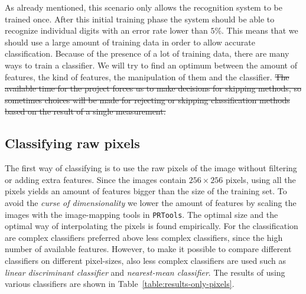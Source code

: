 \documentclass{article}
\begin{document}
As already mentioned, this scenario only allows the recognition system to be trained once. After this initial training phase the system should be able to recognize individual digits with an error rate lower than $5\%$. This means that we should use a large amount of training data in order to allow accurate classification. Because of the presence of a lot of training data, there are many ways to train a classifier. We will try to find an optimum between the amount of features, the kind of features, the manipulation of them and the classifier. \st{The available time for the project forces us to make decisions for skipping methods, so sometimes choices will be made for rejecting or skipping classification methods based on the result of a single measurement.} 

\subsection{Classifying raw pixels}
The first way of classifying is to use the raw pixels of the image without filtering or adding extra features. Since the images contain $256 \times 256$ pixels, using all the pixels yields an amount of features bigger than the size of the training set. To avoid the \emph{curse of dimensionality} we lower the amount of features by scaling the images with the image-mapping tools in \texttt{PRTools}. The optimal size and the optimal way of interpolating the pixels is found empirically. For the classification are complex classifiers preferred above less complex classifiers, since the high number of available features. However, to make it possible to compare different classifiers on different pixel-sizes, also less complex classifiers are used such as \textit{linear discriminant classifier} and \textit{nearest-mean classifier}. The results of using various classifiers are shown in Table~\ref{table:results-only-pixels}.
\end{document}

